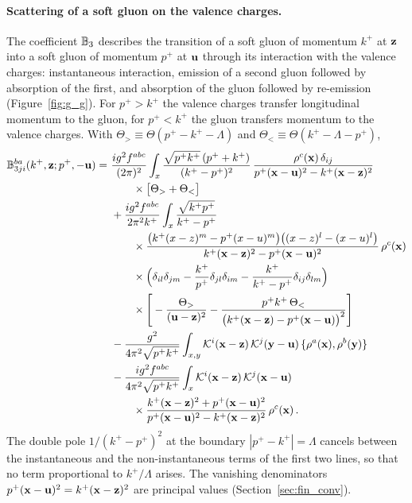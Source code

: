 \paragraph{Scattering of a soft gluon on the valence charges.} The coefficient $\mathbb{B}_3$ describes the transition of a soft gluon of momentum $k^+$ at $\mathbf{z}$ into a soft gluon of momentum $p^+$ at $\mathbf{u}$ through its interaction with the valence charges: instantaneous interaction, emission of a second gluon followed by absorption of the first, and absorption of the gluon followed by re-emission (Figure~\ref{fig:g_g}). For $p^+>k^+$ the valence charges transfer longitudinal momentum to the gluon, for $p^+<k^+$ the gluon transfers momentum to the valence charges. With $\Theta_>\equiv\Theta(p^+-k^+-\Lambda)$ and $\Theta_<\equiv\Theta(k^+-\Lambda-p^+)$,
\begin{align}\label{eq:B3}
\mf B^{ba}_{3ji}(k^+,\v z;p^+,-\v u)=\ &\frac{ig^2f^{abc}}{(2\pi)^2}\int_x\frac{\sqrt{p^+k^+}\,(p^++k^+)}{(k^+-p^+)^2}\,\frac{\rho^c(\v x)\,\delta_{ij}}{p^+(\v x-\v u)^2-k^+(\v x-\v z)^2}
\notag\\&\qquad\times\big[\Theta_>+\Theta_<\big]
\notag\\&
+\frac{ig^2f^{abc}}{2\pi^2k^+}\int_x\frac{\sqrt{k^+p^+}}{k^+-p^+}
\notag\\&\qquad\times\frac{\big(k^+(x-z)^m-p^+(x-u)^m\big)\big((x-z)^l-(x-u)^l\big)}{k^+(\v x-\v z)^2-p^+(\v x-\v u)^2}\,\rho^c(\v x)
\notag\\&\qquad\times\Big(\delta_{il}\delta_{jm}-\frac{k^+}{p^+}\delta_{jl}\delta_{im}-\frac{k^+}{k^+-p^+}\delta_{ij}\delta_{lm}\Big)
\notag\\&\qquad\times\Bigg[-\frac{\Theta_>}{(\v u-\v z)^2}-\frac{p^+k^+\,\Theta_<}{\big(k^+(\v x-\v z)-p^+(\v x-\v u)\big)^2}\Bigg]
\notag\\&
-\frac{g^2}{4\pi^2\sqrt{p^+k^+}}\int_{x,y}\Kv^i(\v x-\v z)\,\Kv^j(\v y-\v u)\,\{\rho^a(\v x),\rho^b(\v y)\}
\notag\\&
-\frac{ig^2f^{abc}}{4\pi^2\sqrt{p^+k^+}}\int_x\Kv^i(\v x-\v z)\,\Kv^j(\v x-\v u)
\notag\\&\qquad\times\frac{k^+(\v x-\v z)^2+p^+(\v x-\v u)^2}{p^+(\v x-\v u)^2-k^+(\v x-\v z)^2}\,\rho^c(\v x)\,.
\end{align}
The double pole $1/(k^+-p^+)^2$ at the boundary $|p^+-k^+|=\Lambda$ cancels between the instantaneous and the non-instantaneous terms of the first two lines, so that no term proportional to $k^+/\Lambda$ arises. The vanishing denominators $p^+(\mathbf{x}-\mathbf{u})^2=k^+(\mathbf{x}-\mathbf{z})^2$ are principal values (Section~\ref{sec:fin_conv}).

